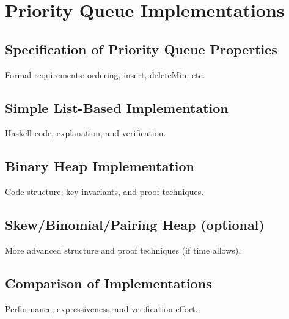 \chapter { Priority Queue Implementations }
\section { Specification of Priority Queue Properties }
Formal requirements: ordering, insert, deleteMin, etc.

\section { Simple List-Based Implementation }
Haskell code, explanation, and verification.

\section { Binary Heap Implementation }
Code structure, key invariants, and proof techniques.

\section { Skew/Binomial/Pairing Heap (optional) }
More advanced structure and proof techniques (if time allows).

\section { Comparison of Implementations }
Performance, expressiveness, and verification effort.
